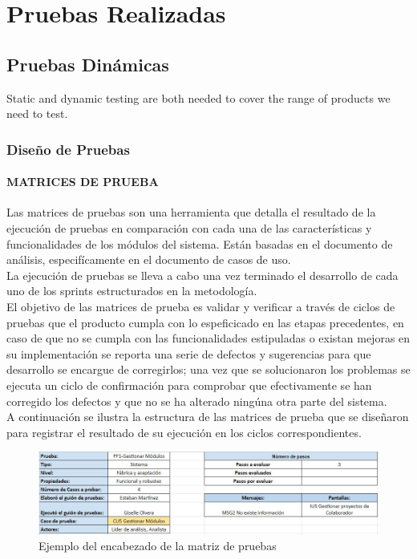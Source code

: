 \chapter{Pruebas Realizadas} \label{cap:ocho}
\section{Pruebas Dinámicas}
Static and dynamic testing are
both needed to cover the range of products we need to test. 

\subsection{Diseño de Pruebas}

\subsubsection{MATRICES DE PRUEBA}

Las matrices de pruebas son una herramienta que detalla el resultado de la ejecución de pruebas en comparación con cada una de las características y funcionalidades de los módulos del sistema. Están basadas en el documento de análisis, especifícamente en el documento de casos de uso.\\

La ejecución de pruebas se lleva a cabo una vez terminado el desarrollo de cada uno de los sprints estructurados en la metodología.\\

El objetivo de las matrices de prueba es validar y verificar a través de ciclos de pruebas que el producto cumpla con lo espeficicado en las etapas precedentes, en caso de que no se cumpla con las funcionalidades estipuladas o existan mejoras en su implementación se reporta una serie de defectos y sugerencias para que desarrollo se encargue de corregirlos; una vez que se solucionaron los problemas se ejecuta un ciclo de confirmación para comprobar que efectivamente se han corregido los defectos y que no se ha alterado ningúna otra parte del sistema.\\

A continuación se ilustra la estructura de las matrices de prueba que se diseñaron para registrar el resultado de su ejecución en los ciclos correspondientes.\\

\begin{figure}[H]
	\begin{center}
		\includegraphics[width=.95\textwidth]{images/pruebas/diseno/encabezado}
		\caption{Ejemplo del encabezado de la matriz de pruebas}
		\label{fig:encabezado}
	\end{center}
\end{figure}

